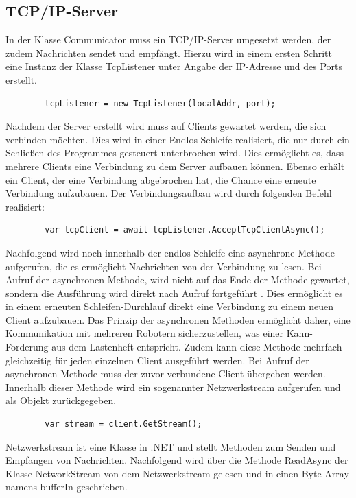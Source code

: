\documentclass[ a4paper,
                oneside,
                toc=bibliography,
                toc=listof
                ]{scrbook}
\begin{document}
   	\subsection{TCP/IP-Server}
   	In der Klasse Communicator muss ein TCP/IP-Server umgesetzt werden, der zudem Nachrichten sendet und empfängt.
   	Hierzu wird in einem ersten Schritt eine Instanz der Klasse TcpListener unter Angabe der IP-Adresse und des Ports erstellt. \cite{MicrosoftTCP}\\
   	\begin{lstlisting}
   		tcpListener = new TcpListener(localAddr, port);
   	\end{lstlisting}
   	Nachdem der Server erstellt wird muss auf Clients gewartet werden, die sich verbinden möchten. Dies wird in einer Endlos-Schleife realisiert, die nur durch ein Schließen des Programmes gesteuert unterbrochen wird. Dies ermöglicht es, dass mehrere Clients eine Verbindung zu dem Server aufbauen können. Ebenso erhält ein Client, der eine Verbindung abgebrochen hat, die Chance eine erneute Verbindung aufzubauen. Der Verbindungsaufbau wird durch folgenden Befehl realisiert:
   	\begin{lstlisting}
   		var tcpClient = await tcpListener.AcceptTcpClientAsync();
   	\end{lstlisting}
   	Nachfolgend wird noch innerhalb der endlos-Schleife eine asynchrone Methode aufgerufen, die es ermöglicht Nachrichten von der Verbindung zu lesen.
   	Bei Aufruf der asynchronen Methode, wird nicht auf das Ende der Methode gewartet, sondern die Ausführung wird direkt nach Aufruf fortgeführt \cite{kotz2022c}. Dies ermöglicht es in einem erneuten Schleifen-Durchlauf direkt eine Verbindung zu einem neuen Client aufzubauen. Das Prinzip der asynchronen Methoden ermöglicht daher, eine Kommunikation mit mehreren Robotern sicherzustellen, was einer Kann-Forderung aus dem Lastenheft entspricht. Zudem kann diese Methode mehrfach gleichzeitig für jeden einzelnen Client ausgeführt werden. Bei Aufruf der asynchronen Methode muss der zuvor verbundene Client übergeben werden.
   	Innerhalb dieser Methode wird ein sogenannter Netzwerkstream aufgerufen und als Objekt zurückgegeben.
   	\begin{lstlisting}
   		var stream = client.GetStream();
   	\end{lstlisting}
   	Netzwerkstream ist eine Klasse in .NET und stellt Methoden zum Senden und Empfangen von Nachrichten.
   	Nachfolgend wird über die Methode ReadAsync der Klasse NetworkStream von dem Netzwerkstream gelesen und in einen Byte-Array namens bufferIn geschrieben.
\end{document}
